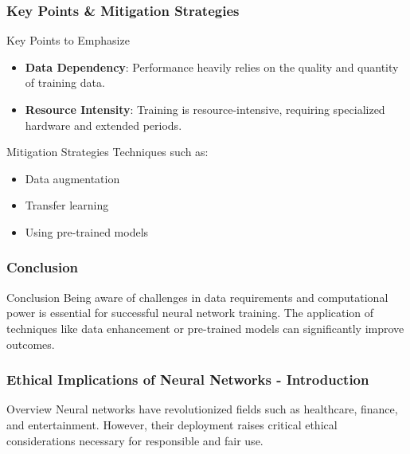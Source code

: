 \documentclass[aspectratio=169]{beamer}
\begin{document}
\begin{frame}[fragile]
    \frametitle{Key Points & Mitigation Strategies}
    \begin{block}{Key Points to Emphasize}
        \begin{itemize}
            \item \textbf{Data Dependency}:
            Performance heavily relies on the quality and quantity of training data.
            \item \textbf{Resource Intensity}:
            Training is resource-intensive, requiring specialized hardware and extended periods.
        \end{itemize}
    \end{block}
    
    \begin{block}{Mitigation Strategies}
        Techniques such as:
        \begin{itemize}
            \item Data augmentation
            \item Transfer learning
            \item Using pre-trained models
        \end{itemize}
    \end{block}
\end{frame}

\begin{frame}[fragile]
    \frametitle{Conclusion}
    \begin{block}{Conclusion}
    Being aware of challenges in data requirements and computational power is essential for successful neural network training. The application of techniques like data enhancement or pre-trained models can significantly improve outcomes.
    \end{block}
\end{frame}

\begin{frame}[fragile]
    \frametitle{Ethical Implications of Neural Networks - Introduction}
    \begin{block}{Overview}
        Neural networks have revolutionized fields such as healthcare, finance, and entertainment. 
        However, their deployment raises critical ethical considerations necessary for responsible and fair use.
    \end{block}
\end{frame}
\end{document}
